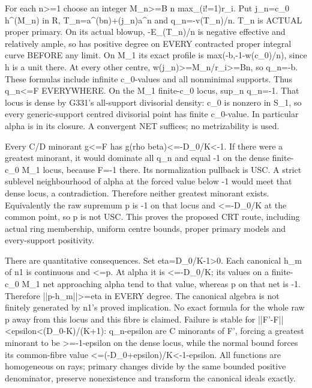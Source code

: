 \documentclass[11pt]{article}
\begin{document}
For each n\textgreater{}=1 choose an integer M\_n\textgreater{}=B n max\_(i!=1)r\_i. Put j\_n=c\_0 h\textasciicircum{}(M\_n) in R, T\_n=a\textasciicircum{}(bn)+(j\_n)a\textasciicircum{}n and q\_n=-v(T\_n)/n. T\_n is ACTUAL proper primary. On its actual blowup, -E\_(T\_n)/n is negative effective and relatively ample, so has positive degree on EVERY contracted proper integral curve BEFORE any limit. On M\_1 its exact profile is max(-b,-1-w(c\_0)/n), since h is a unit there. At every other centre, w(j\_n)\textgreater{}=M\_n/r\_i\textgreater{}=Bn, so q\_n=-b. These formulas include infinite c\_0-values and all nonminimal supports. Thus q\_n\textless{}=F EVERYWHERE. On the M\_1 finite-c\_0 locus, sup\_n q\_n=-1. That locus is dense by G331's all-support divisorial density: c\_0 is nonzero in S\_1, so every generic-support centred divisorial point has finite c\_0-value. In particular alpha is in its closure. A convergent NET suffices; no metrizability is used.

Every C/D minorant g\textless{}=F has g(rho beta)\textless{}=-D\_0/K\textless{}-1. If there were a greatest minorant, it would dominate all q\_n and equal -1 on the dense finite-c\_0 M\_1 locus, because F=-1 there. Its normalization pullback is USC. A strict sublevel neighbourhood of alpha at the forced value below -1 would meet that dense locus, a contradiction. Therefore neither greatest minorant exists. Equivalently the raw supremum p is -1 on that locus and \textless{}=-D\_0/K at the common point, so p is not USC. This proves the proposed CRT route, including actual ring membership, uniform centre bounds, proper primary models and every-support positivity.

There are quantitative consequences. Set eta=D\_0/K-1\textgreater{}0. Each canonical h\_m of n1 is continuous and \textless{}=p. At alpha it is \textless{}=-D\_0/K; its values on a finite-c\_0 M\_1 net approaching alpha tend to that value, whereas p on that net is -1. Therefore ||p-h\_m||\textgreater{}=eta in EVERY degree. The canonical algebra is not finitely generated by n1's proved implication. No exact formula for the whole raw p away from this locus and this fibre is claimed. Failure is stable for ||F'-F||\textless{}epsilon\textless{}(D\_0-K)/(K+1): q\_n-epsilon are C minorants of F', forcing a greatest minorant to be \textgreater{}=-1-epsilon on the dense locus, while the normal bound forces its common-fibre value \textless{}=(-D\_0+epsilon)/K\textless{}-1-epsilon. All functions are homogeneous on rays; primary changes divide by the same bounded positive denominator, preserve nonexistence and transform the canonical ideals exactly.
\end{document}
